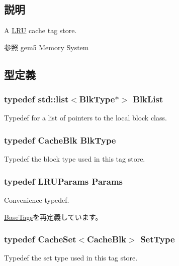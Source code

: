 \subsection{説明}
A \hyperlink{classLRU}{LRU} cache tag store. \begin{DoxySeeAlso}{参照}
gem5 Memory System 
\end{DoxySeeAlso}


\subsection{型定義}
\hypertarget{classLRU_a10e9d0cbb622eb6efe1dd332af622902}{
\subsubsection[{BlkList}]{\setlength{\rightskip}{0pt plus 5cm}typedef {\bf std::list}$<${\bf BlkType}$\ast$$>$ {\bf BlkList}}}
\label{classLRU_a10e9d0cbb622eb6efe1dd332af622902}
Typedef for a list of pointers to the local block class. \hypertarget{classLRU_a005ef3750319995a4a77bcfeee56e222}{
\subsubsection[{BlkType}]{\setlength{\rightskip}{0pt plus 5cm}typedef {\bf CacheBlk} {\bf BlkType}}}
\label{classLRU_a005ef3750319995a4a77bcfeee56e222}
Typedef the block type used in this tag store. \hypertarget{classLRU_a7817e729934956b9b3573d13924bf1eb}{
\subsubsection[{Params}]{\setlength{\rightskip}{0pt plus 5cm}typedef LRUParams {\bf Params}}}
\label{classLRU_a7817e729934956b9b3573d13924bf1eb}
Convenience typedef. 

\hyperlink{classBaseTags_aab33a5313a7ca07c69f8a4e6e1490375}{BaseTags}を再定義しています。\hypertarget{classLRU_a3c0e5e439e276493def31913011594ff}{
\subsubsection[{SetType}]{\setlength{\rightskip}{0pt plus 5cm}typedef {\bf CacheSet}$<${\bf CacheBlk}$>$ {\bf SetType}}}
\label{classLRU_a3c0e5e439e276493def31913011594ff}
Typedef the set type used in this tag store. 

